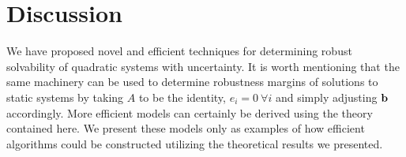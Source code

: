 \section{Discussion} \label{sec:disc}


We have proposed novel and efficient techniques for determining robust solvability of quadratic systems with uncertainty. 
It is worth mentioning that the same machinery can be used to determine robustness margins of solutions to static systems by taking $A$ to be the identity, $e_i=0 \ \forall i$ and simply adjusting $\mathbf{b}$ accordingly.  
More efficient models can certainly be derived using the theory contained here. 
We present these models only as examples of how efficient algorithms could be constructed utilizing the theoretical results we presented. 
